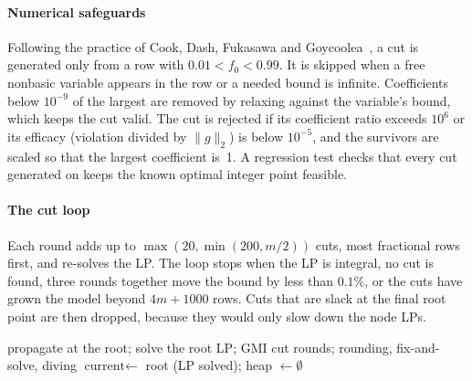 \paragraph{Numerical safeguards}
Following the practice of Cook, Dash, Fukasawa and Goycoolea~\cite{cook2009}, a cut is generated only
from a row with $0.01<f_0<0.99$. It is skipped when a free nonbasic variable appears in the row or a
needed bound is infinite. Coefficients below $10^{-9}$ of the largest are removed by relaxing against
the variable's bound, which keeps the cut valid. The cut is rejected if its coefficient ratio exceeds
$10^6$ or its efficacy (violation divided by $\|g\|_2$) is below $10^{-5}$, and the survivors are
scaled so that the largest coefficient is~1. A regression test checks that every cut generated on
 keeps the known optimal integer point feasible.

\paragraph{The cut loop}
Each round adds up to $\max(20,\min(200,m/2))$ cuts, most fractional rows first, and re-solves the LP.
The loop stops when the LP is integral, no cut is found, three rounds together move the bound by less
than $0.1\%$, or the cuts have grown the model beyond $4m+1000$ rows. Cuts that are slack at the final
root point are then dropped, because they would only slow down the node LPs.

\begin{algorithm}[t]
\caption{Branch-and-bound with plunging (, simplified)}\label{alg:bnb}
propagate at the root; solve the root LP; GMI cut rounds; rounding, fix-and-solve, diving\;
$\text{current}\leftarrow$ root (LP solved); heap $\leftarrow\emptyset$\;
\end{algorithm}
